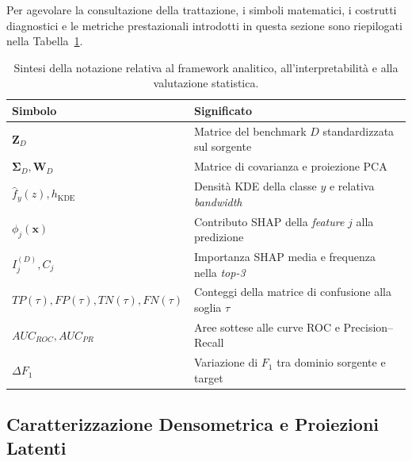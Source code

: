 Per agevolare la consultazione della trattazione, i simboli matematici, i costrutti diagnostici e le metriche prestazionali introdotti in questa sezione sono riepilogati nella Tabella~\ref{tab:notazione_framework}.

\begin{table}[H]
    \centering
    \small
    \caption{Sintesi della notazione relativa al framework analitico, all'interpretabilità e alla valutazione statistica.}
    \label{tab:notazione_framework}
    \begin{tabularx}{\textwidth}{
        l
        >{\raggedright\arraybackslash}X
    }
        \toprule
        \textbf{Simbolo} & \textbf{Significato} \\
        \midrule

        $\mathbf{Z}_D$ &
        Matrice del benchmark $D$ standardizzata sul sorgente \\

        $\boldsymbol{\Sigma}_D, \mathbf{W}_D$ &
        Matrice di covarianza e proiezione PCA \\

        $\hat{f}_y(z), h_{\text{KDE}}$ &
        Densità KDE della classe $y$ e relativa \textit{bandwidth} \\

        $\phi_j(\mathbf{x})$ &
        Contributo SHAP della \textit{feature} $j$ alla predizione \\

        $I_j^{(D)}, C_j$ &
        Importanza SHAP media e frequenza nella \textit{top-3} \\

        $TP(\tau), FP(\tau), TN(\tau), FN(\tau)$ &
        Conteggi della matrice di confusione alla soglia $\tau$ \\

        $AUC_{ROC}, AUC_{PR}$ &
        Aree sottese alle curve ROC e Precision--Recall \\

        $\Delta F_1$ &
        Variazione di $F_1$ tra dominio sorgente e target \\

        \bottomrule
    \end{tabularx}
\end{table}

\subsection{Caratterizzazione Densometrica e Proiezioni Latenti}
\label{subsec:proiezioni_densita}

